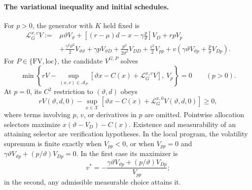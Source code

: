 \documentclass[12pt]{article}
\begin{document}
\paragraph{The variational inequality and initial schedules.}
For \(p>0\), the generator with \(K\) held fixed is
\begin{equation}\label{eq:gbm-generator}
\begin{aligned}
  \mathcal L_G^{x,v}V
   :={}&\mu\vartheta V_\vartheta
       +\left[(r-\mu)d-x-\gamma\frac p\vartheta\right]V_D
       +rpV_p\\
      &+\frac{\gamma^2\vartheta^2}{2}V_{\vartheta\vartheta}
       +\gamma pV_{\vartheta D}
       +\frac{p^2}{2\vartheta^2}V_{DD}
       +\frac{v^2}{2}V_{pp}
       +v\left(\gamma\vartheta V_{\vartheta p}
                         +\frac p\vartheta V_{Dp}\right).
\end{aligned}
\end{equation}
For \(P\in\{\mathrm{FV},\mathrm{loc}\}\), the candidate
\(V^{G,P}\) solves
\begin{equation}\label{eq:gbm-hjb}
  \min\left\{
    rV-\sup_{(x,v)\in\mathcal A_P}
      [\vartheta x-C(x)+\mathcal L_G^{x,v}V],\ V_p
  \right\}=0\qquad(p>0).
\end{equation}
At \(p=0\), its \(C^2\) restriction to \((\vartheta,d)\) obeys
\begin{equation}\label{eq:gbm-hjb-boundary}
  rV(\vartheta,d,0)
   -\sup_{x\in\mathcal X}
     [\vartheta x-C(x)+\mathcal L_G^{x,0}V(\vartheta,d,0)]\geq0,
\end{equation}
where terms involving \(p\), \(v\), or derivatives in \(p\) are
omitted. Pointwise allocation selectors maximize
\(x(\vartheta-V_D)-C(x)\). Existence and measurability of an
attaining selector are verification hypotheses. In the local program,
the volatility supremum is finite exactly when \(V_{pp}<0\), or
when \(V_{pp}=0\) and
\(\gamma\vartheta V_{\vartheta p}+(p/\vartheta)V_{Dp}=0\).
In the first case its maximizer is
\[
  v^*=-\frac{\gamma\vartheta V_{\vartheta p}
                    +(p/\vartheta)V_{Dp}}{V_{pp}};
\]
in the second, any admissible measurable choice attains it.
\end{document}
